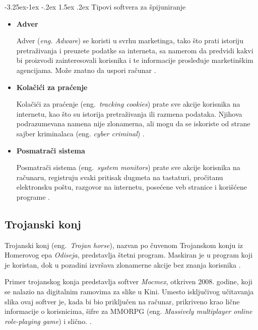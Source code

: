\documentclass[a4paper]{article}
\makeatletter
\renewcommand\paragraph{\@startsection{paragraph}{4}{\z@}%
   {-3.25ex\@plus -1ex \@minus -.2ex}%
   {1.5ex \@plus .2ex}%
   {\normalfont\normalsize\bfseries}}
\makeatother
\begin{document}
\paragraph{Tipovi softvera za špijuniranje}
\begin{itemize}
\item \textbf{Adver}

Adver (\textit{eng. Adware}) se koristi u svrhu marketinga, tako što prati istoriju pretraživanja i preuzete podatke sa interneta, sa namerom da predvidi kakvi bi proizvodi zainteresovali korisnika i te informacije prosleđuje marketinškim agencijama. Može znatno da uspori računar \cite{spyware}.

\item \textbf{Kolačići za praćenje}

Kolačići za praćenje (eng.~{\em tracking cookies}) prate sve akcije korisnika na internetu, kao što su istorija pretraživanja ili razmena podataka. Njihova podrazumevana namena nije zlonamerna, ali mogu da se iskoriste od strane sajber kriminalaca (eng. \textit{cyber criminal}) \cite{tracking_cookies}.

\item \textbf{Posmatrači sistema}

Posmatrači sistema (eng.~{\em system monitors}) prate sve akcije korisnika na računaru, registruju svaki pritisak dugmeta na tastaturi, pročitanu elektronsku poštu, razgovor na internetu, posećene veb stranice i korišćene programe \cite{spyware}.
    
\end{itemize}

\subsection{Trojanski konj}
\label{Odisej}

Trojanski konj (eng.~{\em Trojan horse}), nazvan po čuvenom Trojanskom konju iz Homerovog epa \textit{Odiseja}, predstavlja štetni program. Maskiran je u program koji je koristan, dok u pozadini izvršava zlonamerne akcije bez znanja korisnika \cite{trojanhorse}.

Primer trojanskog konja predstavlja softver \textit{Mocmex}, otkriven 2008. godine, koji se nalazio na digitalnim ramovima za slike u Kini. Umesto isključivog učitavanja slika ovaj softver je, kada bi bio priključen na računar, prikriveno krao lične informacije o korisnicima, šifre za MMORPG (eng. \textit{Massively multiplayer online role-playing game}) i slično. \cite{ethics}. 
\end{document}
